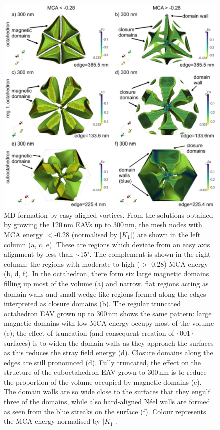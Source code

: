 \documentclass[review]{elsarticle}
\newcommand{\roughly}{{\raise.17ex\hbox{$\scriptstyle\sim$}}}
\begin{document}
\allowdisplaybreaks

\begin{figure}[ht]
\centering
\includegraphics[width=\textwidth]{Figure_06.pdf}
\caption{MD formation by easy aligned vortices. From the solutions obtained by growing the 120$\,\text{nm}$ EAVs up to 300$\,\text{nm}$, the mesh nodes with MCA energy $<$-0.28 (normalised by $|K_1|$) are shown in the left column (a, c, e). These are regions which deviate from an easy axis alignment by less than $\roughly$15$^{\circ}$. The complement is shown in the right column: the regions with moderate to high ($>$-0.28) MCA energy (b, d, f). In the octahedron, there form six large magnetic domains filling up most of the volume (a) and narrow, flat regions acting as domain walls and small wedge-like regions formed along the edges interpreted as closure domains (b). The regular truncated octahedron EAV grown up to 300$\,\text{nm}$ shows the same pattern: large magnetic domains with low MCA energy occupy most of the volume (c); the effect of truncation (and consequent creation of $\{001\}$ surfaces) is to widen the domain walls as they approach the surfaces as this reduces the stray field energy (d). Closure domains along the edges are still pronounced (d). Fully truncated, the effect on the structure of the cuboctahedron EAV grown to 300$\,\text{nm}$ is to reduce the proportion of the volume occupied by magnetic domains (e). The domain walls are so wide close to the surfaces that they engulf three of the domains, while also hard-aligned N\'eel walls are formed as seen from the blue streaks on the surface (f). Colour represents the MCA energy normalised by $|K_1|$.}
\label{fig6}
\end{figure}
\end{document}
